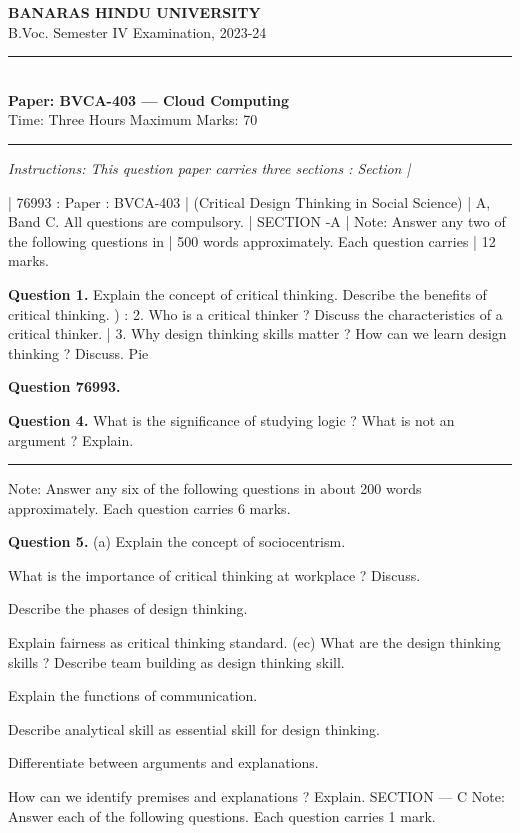 \documentclass[11pt,a4paper]{article}
\begin{document}
\begin{center}
  {\large\bfseries BANARAS HINDU UNIVERSITY}\\[2pt]
  {\normalsize B.Voc. Semester IV Examination, 2023-24}\\[6pt]
  \rule{0.8\linewidth}{0.5pt}\\[6pt]
  {\large\bfseries Paper: BVCA-403 --- Cloud Computing}\\[4pt]
  {\normalsize Time: Three Hours \hfill Maximum Marks: 70}
\end{center}

\rule{\linewidth}{0.4pt}

\smallskip
\noindent\textit{Instructions: This question paper carries three sections : Section |}

\bigskip

| 76993
: Paper : BVCA-403
| (Critical Design Thinking in Social Science)
| A, Band C. All questions are compulsory.
| SECTION -A
| Note: Answer any two of the following questions in
| 500 words approximately. Each question carries
| 12 marks.

\medskip\noindent\textbf{Question 1.} Explain the concept of critical thinking. Describe the
benefits of critical thinking.
)
: 2. Who is a critical thinker ? Discuss the characteristics of
a critical thinker.
| 3. Why design thinking skills matter ? How can we learn
design thinking ? Discuss.
Pie

\medskip\noindent\textbf{Question 76993.}

\medskip\noindent\textbf{Question 4.} What is the significance of studying logic ? What is not
an argument ? Explain.

\bigskip{}
\rule{\linewidth}{0.4pt}\smallskip

Note: Answer any six of the following questions in about
200 words approximately. Each question carries
6 marks.

\medskip\noindent\textbf{Question 5.} (a) Explain the concept of sociocentrism.
\begin{parts}
  \item What is the importance of critical thinking at
  workplace ? Discuss.
  \item Describe the phases of design thinking.
  \item Explain fairness as critical thinking standard.
  (ec) What are the design thinking skills ? Describe
  team building as design thinking skill.
  \item Explain the functions of communication.
  \item Describe analytical skill as essential skill for
  design thinking.
  \item Differentiate between arguments and
  explanations.
  \item How can we identify premises and explanations ?
  Explain.
  SECTION --- C
  Note: Answer each of the following questions. Each
  question carries 1 mark.
\end{parts}
\end{document}
